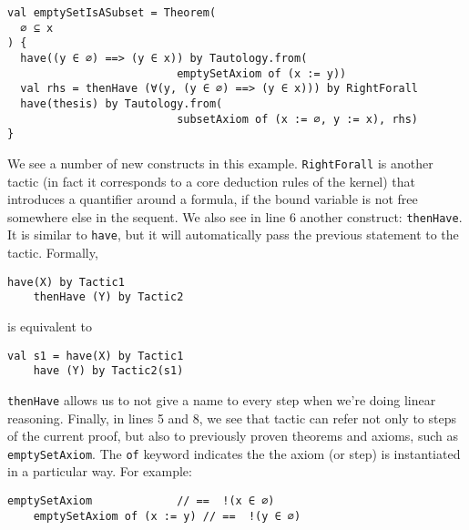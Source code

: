 \noindent\begin{minipage}{\linewidth}\vspace{1em}
  \begin{lstlisting}[language=lisa, frame=single]
val emptySetIsASubset = Theorem(
  ∅ ⊆ x
) {
  have((y ∈ ∅) ==> (y ∈ x)) by Tautology.from(
                          emptySetAxiom of (x := y))
  val rhs = thenHave (∀(y, (y ∈ ∅) ==> (y ∈ x))) by RightForall
  have(thesis) by Tautology.from(
                          subsetAxiom of (x := ∅, y := x), rhs)
}
  \end{lstlisting}
\end{minipage}
We see a number of new constructs in this example. \lstinline|RightForall| is another tactic (in fact it corresponds to a core deduction rules of the kernel) that introduces a quantifier around a formula, if the bound variable is not free somewhere else in the sequent.
We also see in line 6 another construct: \lstinline|thenHave|. It is similar to \lstinline|have|, but it will automatically pass the previous statement to the tactic. Formally,
\noindent\begin{minipage}{\linewidth}\vspace{1em}
  \begin{lstlisting}[language=lisa, frame=single]
    have(X) by Tactic1
    thenHave (Y) by Tactic2
  \end{lstlisting}
\end{minipage}
is equivalent to

\noindent\begin{minipage}{\linewidth}\vspace{1em}
  \begin{lstlisting}[language=lisa, frame=single]
    val s1 = have(X) by Tactic1
    have (Y) by Tactic2(s1)
  \end{lstlisting}
\end{minipage}
\lstinline|thenHave| allows us to not give a name to every step when we're doing linear reasoning. Finally, in lines 5 and 8, we see that tactic can refer not only to steps of the current proof, but also to previously proven theorems and axioms, such as \lstinline|emptySetAxiom|. The \lstinline|of| keyword indicates the the axiom (or step) is instantiated in a particular way. For example:
\noindent\begin{minipage}{\linewidth}\vspace{1em}
  \begin{lstlisting}[language=lisa, frame=single]
    emptySetAxiom             // ==  !(x ∈ ∅)
    emptySetAxiom of (x := y) // ==  !(y ∈ ∅)
  \end{lstlisting}
\end{minipage}

